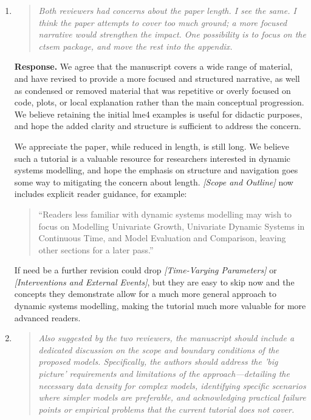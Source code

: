 \documentclass[11pt]{article}
\newcommand{\response}{\textbf{Response.} }
\newcommand{\secit}[1]{\textit{[#1]}}
\newcommand{\msq}[1]{\begin{quote}\small\noindent``#1''\end{quote}}
\newenvironment{reviewerpoint}{\begin{quote}\itshape}{\end{quote}}
\begin{document}
\begin{enumerate}[label=\textbf{Editor Comment \arabic*.}]

\item

\begin{reviewerpoint}
Both reviewers had concerns about the paper length.
I see the same.
I think the paper attempts to cover too much ground; a more focused narrative would strengthen the impact.
One possibility is to focus on the ctsem package, and move the rest into the appendix.
\end{reviewerpoint}

\response We agree that the manuscript covers a wide range of material, and have revised to provide a more focused and structured narrative, as well as condensed or removed material that was repetitive or overly focused on code, plots, or local explanation rather than the main conceptual progression.
We believe retaining the initial lme4 examples is useful for didactic purposes, and hope the added clarity and structure is sufficient to address the concern.

We appreciate the paper, while reduced in length, is still long.
We believe such a tutorial is a valuable resource for researchers interested in dynamic systems modelling, and hope the emphasis on structure and navigation goes some way to mitigating the concern about length.
\secit{Scope and Outline} now includes explicit reader guidance, for example:
\msq{Readers less familiar with dynamic systems modelling may wish to focus on Modelling Univariate Growth, Univariate Dynamic Systems in Continuous Time, and Model Evaluation and Comparison, leaving other sections for a later pass.}
If need be a further revision could drop \secit{Time-Varying Parameters} or \secit{Interventions and External Events}, but they are easy to skip now and the concepts they demonstrate allow for a much more general approach to dynamic systems modelling, making the tutorial much more valuable for more advanced readers.
\item

\begin{reviewerpoint}
Also suggested by the two reviewers, the manuscript should include a dedicated discussion on the scope and boundary conditions of the proposed models.
Specifically, the authors should address the 'big picture' requirements and limitations of the approach---detailing the necessary data density for complex models, identifying specific scenarios where simpler models are preferable, and acknowledging practical failure points or empirical problems that the current tutorial does not cover.
\end{reviewerpoint}


\end{enumerate}
\end{document}

